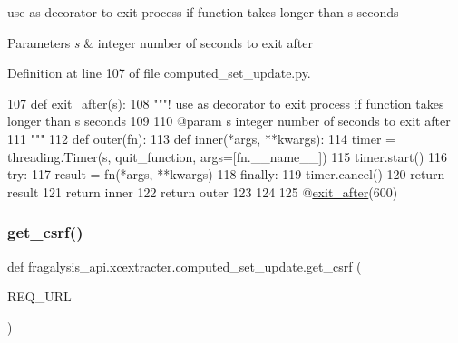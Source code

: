 use as decorator to exit process if function takes longer than s seconds 


\begin{DoxyParams}{Parameters}
{\em s} & integer number of seconds to exit after \\
\hline
\end{DoxyParams}


Definition at line 107 of file computed\+\_\+set\+\_\+update.\+py.


\begin{DoxyCode}
107 \textcolor{keyword}{def }\hyperlink{namespacefragalysis__api_1_1xcextracter_1_1computed__set__update_ab6ecfd5eeae5a05ee20fa0d19c798f48}{exit\_after}(s):
108     \textcolor{stringliteral}{"""! use as decorator to exit process if function takes longer than s seconds}
109 \textcolor{stringliteral}{    }
110 \textcolor{stringliteral}{    @param s integer number of seconds to exit after}
111 \textcolor{stringliteral}{    """}
112     \textcolor{keyword}{def }outer(fn):
113         \textcolor{keyword}{def }inner(*args, **kwargs):
114             timer = threading.Timer(s, quit\_function, args=[fn.\_\_name\_\_])
115             timer.start()
116             \textcolor{keywordflow}{try}:
117                 result = fn(*args, **kwargs)
118             \textcolor{keywordflow}{finally}:
119                 timer.cancel()
120             \textcolor{keywordflow}{return} result
121         \textcolor{keywordflow}{return} inner
122     \textcolor{keywordflow}{return} outer
123 
124 
125 @\hyperlink{namespacefragalysis__api_1_1xcextracter_1_1computed__set__update_ab6ecfd5eeae5a05ee20fa0d19c798f48}{exit\_after}(600)
\end{DoxyCode}
\mbox{\label{namespacefragalysis__api_1_1xcextracter_1_1computed__set__update_a5737d189121121fcfc89d399bf38e877}} 
\subsubsection{\texorpdfstring{get\+\_\+csrf()}{get\_csrf()}}
{\footnotesize\ttfamily def fragalysis\+\_\+api.\+xcextracter.\+computed\+\_\+set\+\_\+update.\+get\+\_\+csrf (\begin{DoxyParamCaption}\item[{}]{R\+E\+Q\+\_\+\+U\+RL }\end{DoxyParamCaption})}



